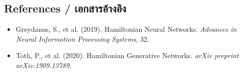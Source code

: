 \subsection{References \quad / \quad \textthai{เอกสารอ้างอิง}}
\begin{itemize}
    \item Greydanus, S., et al. (2019). Hamiltonian Neural Networks. \textit{Advances in Neural Information Processing Systems}, 32.
    \item Toth, P., et al. (2020). Hamiltonian Generative Networks. \textit{arXiv preprint arXiv:1909.13789}.
\end{itemize}
